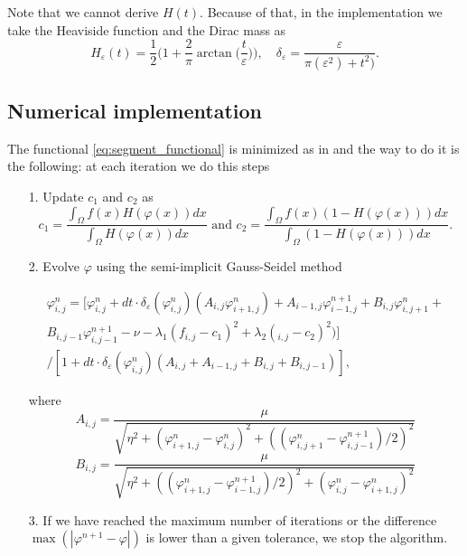 \documentclass[10pt,a4paper]{llncs}
\begin{document}
\noindent
Note that we cannot derive $H(t)$. Because of that, in the implementation we take the Heaviside function and the Dirac mass as
\begin{equation}
H_{\varepsilon}(t) = \frac{1}{2}\bigg(1 + \frac{2}{\pi}\arctan \bigg(\frac{t}{\varepsilon}\bigg)\bigg),\quad\delta_{\varepsilon} = \frac{\varepsilon}{\pi(\varepsilon^2)+t^2)}.
\end{equation}
\subsection{Numerical implementation}
The functional \ref{eq:segment_functional} is minimized as in \cite{getreuer2012chan} and the way to do it is the following: at each iteration we do this steps
\begin{enumerate}
\item[1.] Update $c_1$ and $c_2$ as 
\begin{equation}
c_1 = \frac{\int_{\Omega}f(x)H(\varphi(x))dx}{\int_{\Omega}H(\varphi(x))dx} \text{ and } c_2 = \frac{\int_{\Omega}f(x)(1-H(\varphi(x)))dx}{\int_{\Omega}(1-H(\varphi(x)))dx}.
\end{equation}

\item [2.] Evolve $\varphi$ using the semi-implicit Gauss-Seidel method \cite{aubert1997variational}

\begin{equation}
\begin{split}
\varphi_{i,j}^n = [\varphi_{i,j}^n + dt\cdot\delta_{\varepsilon}(\varphi_{i,j}^n)(A_{i,j}\varphi_{i+1,j}^n) + A_{i-1,j}\varphi_{i-1,j}^{n+1}+B_{i,j}\varphi_{i,j+1}^n+\\
B_{i, j-1}\varphi_{i,j-1}^{n+1}-\nu - \lambda_1(f_{i,j}-c_1)^2+\lambda_2(_{i,j}-c_2)^2) ]\\
\big/[1 + dt\cdot\delta_{\varepsilon}(\varphi_{i,j}^n)(A_{i,j} + A_{i-1,j} + B_{i,j} + B_{i,j-1})],
\end{split}
\end{equation}


where
\begin{equation}
A_{i,j} = \frac{\mu}{\sqrt{\eta^2 + (\varphi_{i+1,j}^n-\varphi_{i,j}^n)^2+((\varphi_{i,j+1}^n-\varphi_{i,j-1}^{n+1})/2)^2}}
\label{eq:segment_A}
\end{equation}
\begin{equation}
B_{i,j} = \frac{\mu}{\sqrt{\eta^2+((\varphi_{i+1,j}^n-\varphi_{i-1,j}^{n+1})/2)^2 + (\varphi_{i,j}^n-\varphi_{i+1,j}^n)^2}}
\label{eq:segment_B}
\end{equation}


\item [3.] If we have reached the maximum number of iterations or the difference $\max(|\varphi^{n+1}-\varphi|)$ is lower than a given tolerance, we stop the algorithm.
\end{enumerate}
\end{document}
